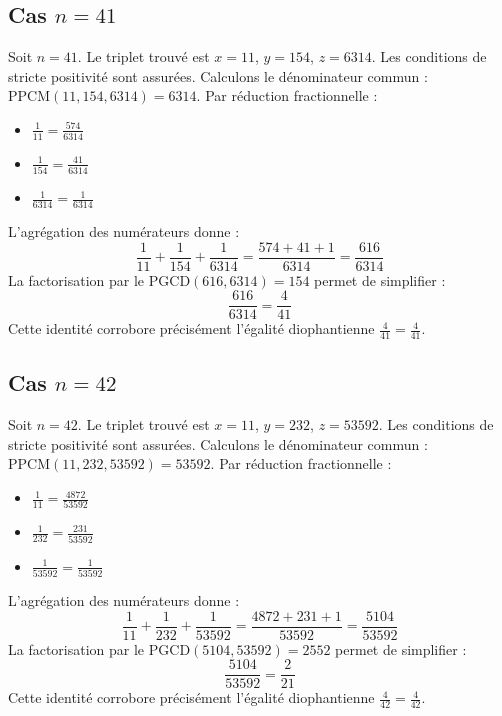\documentclass[11pt,a4paper]{article}
\begin{document}
\subsection{Cas $n = 41$}
Soit $n = 41$. Le triplet trouvé est $x = 11$, $y = 154$, $z = 6314$.
Les conditions de stricte positivité sont assurées.
Calculons le dénominateur commun : $\text{PPCM}(11, 154, 6314) = 6314$.
Par réduction fractionnelle :
\begin{itemize}
    \item $\frac{1}{11} = \frac{574}{6314}$
    \item $\frac{1}{154} = \frac{41}{6314}$
    \item $\frac{1}{6314} = \frac{1}{6314}$
\end{itemize}
L'agrégation des numérateurs donne :
$$ \frac{1}{11} + \frac{1}{154} + \frac{1}{6314} = \frac{574 + 41 + 1}{6314} = \frac{616}{6314} $$
La factorisation par le $\text{PGCD}(616, 6314) = 154$ permet de simplifier :
$$ \frac{616}{6314} = \frac{4}{41} $$
Cette identité corrobore précisément l'égalité diophantienne $\frac{4}{41} = \frac{4}{41}$.

\subsection{Cas $n = 42$}
Soit $n = 42$. Le triplet trouvé est $x = 11$, $y = 232$, $z = 53592$.
Les conditions de stricte positivité sont assurées.
Calculons le dénominateur commun : $\text{PPCM}(11, 232, 53592) = 53592$.
Par réduction fractionnelle :
\begin{itemize}
    \item $\frac{1}{11} = \frac{4872}{53592}$
    \item $\frac{1}{232} = \frac{231}{53592}$
    \item $\frac{1}{53592} = \frac{1}{53592}$
\end{itemize}
L'agrégation des numérateurs donne :
$$ \frac{1}{11} + \frac{1}{232} + \frac{1}{53592} = \frac{4872 + 231 + 1}{53592} = \frac{5104}{53592} $$
La factorisation par le $\text{PGCD}(5104, 53592) = 2552$ permet de simplifier :
$$ \frac{5104}{53592} = \frac{2}{21} $$
Cette identité corrobore précisément l'égalité diophantienne $\frac{4}{42} = \frac{4}{42}$.
\end{document}
